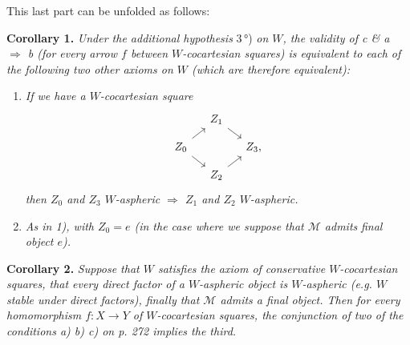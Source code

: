 \documentclass[11pt]{article}
\newcommand{\msp}[1]{\marginpar{\footnotesize [#1]}}
\begin{document}
This last part can be unfolded as follows:

\textbf{Corollary 1.} \textit{Under the additional hypothesis} \textup{3\,°)} \textit{on $W$, the validity of c \& a $\Longrightarrow$ b (for every arrow $f$ between $W$-cocartesian squares) is equivalent to each of the following two other axioms on $W$ (which are therefore equivalent):}

\begin{enumerate}
\item[\textit{1)}] \textit{If we have a $W$-cocartesian square}
\[
\begin{tikzcd}[ampersand replacement=\&, column sep=small, row sep=small]
 \& Z_1 \arrow[dr] \& \\
Z_0 \arrow[ur] \arrow[dr] \& \& Z_3, \\
 \& Z_2 \arrow[ur] \&
\end{tikzcd}
\]
\textit{then $Z_0$ and $Z_3$ $W$-aspheric $\Longrightarrow$ $Z_1$ and $Z_2$ $W$-aspheric.}
\item[\textit{1$'$)}] \textit{As in 1), with $Z_0 = e$ (in the case where we suppose that $\mathcal{M}$ admits} \textit{final object $e$).}
\end{enumerate}

\msp{page 275}

\textbf{Corollary 2.} \textit{Suppose that $W$ satisfies the axiom of conservative $W$-cocartesian squares, that every direct factor of a $W$-aspheric object is $W$-aspheric (e.g. $W$ stable under direct factors), finally that $\mathcal{M}$ admits a final object. Then for every homomorphism $f : X \longrightarrow Y$ of $W$-cocartesian squares, the conjunction of two of the conditions a) b) c) on p. 272 implies the third.} %
\end{document}

